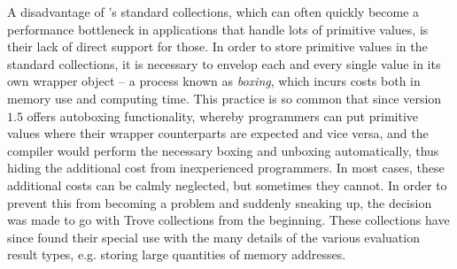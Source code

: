 A disadvantage of \java's standard collections, which can often quickly become a performance bottleneck in
applications that handle lots of primitive values, is their lack of direct support for those. In
order to store primitive values in the standard collections, it is necessary to envelop each and every single
value in its own wrapper object -- a process known as \emph{boxing}, which incurs costs both in memory use and
computing time. This practice is so common that since version $1.5$ \java offers autoboxing functionality,
whereby programmers can put primitive values where their wrapper counterparts are expected and vice versa, and
the \java compiler would perform the necessary boxing and unboxing automatically, thus hiding the additional
cost from inexperienced programmers. In most cases, these additional costs can be calmly neglected, but
sometimes they cannot. In order to prevent this from becoming a problem and suddenly sneaking
up, the decision was made to go with Trove collections from the beginning. These collections have since found
their special use with the many details of the various evaluation result types, e.g. storing large quantities
of memory addresses.